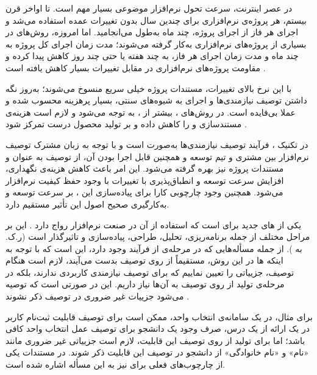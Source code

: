   

در عصر اینترنت، سرعت تحول نرم‌افزار موضوعی بسیار مهم است. تا اواخر قرن
بیستم، هر پروژه‌ی نرم‌افزاری برای چندین سال بدون تغییرات عمده استفاده
می‌شد و اجرای هر فاز از اجرای پروژه، چند ماه به‌طول می‌انجامید. اما
امروزه، روش‌های  در بسیاری از پروژه‌های نرم‌افزاری به‌کار
گرفته می‌شوند؛ مدت زمان اجرای کل پروژه به چند ماه و مدت زمان اجرای هر
فاز، به چند هفته یا حتی چند روز کاهش پیدا کرده و مقاومت پروژه‌های
نرم‌افزاری در مقابل تغییرات بسیار کاهش یافته است .

با این نرخ بالای تغییرات، مستندات پروژه خیلی سریع منسوخ می‌شوند؛ به‌روز
نگه داشتن توصیف نیازمندی‌ها و اجرای  به شیوه‌های سنتی، بسیار
پرهزینه محسوب شده و عملا بی‌فایده است. در روش‌های ،
بیشتر از ، به
 توجه می‌شود و لازم
است هزینه‌ی مستندسازی و  را کاهش داده و بر تولید محصول درست
تمرکز شود .

در تکنیک ، فرآیند توصیف نیازمندی‌ها به‌صورت
 است و با توجه به زبان مشترک توصیف نرم‌افزار بین مشتری و
تیم توسعه و همچنین قابل اجرا بودن آن، از توصیف به عنوان  و
مستندات پروژه نیز بهره گرفته می‌شود. این امر باعث کاهش هزینه‌ی نگهداری،
افزایش سرعت توسعه  و انطباق‌پذیری با تغییرات با وجود حفظ
کیفیت نرم‌افزار می‌شود. همچنین وجود چارچوبی کارا برای پیاده‌سازی این
، بر سرعت توسعه و به‌کارگیری صحیح اصول این 
تأثیر مستقیم دارد.

  یکی
از ‌های جدید برای  است که استفاده از آن در
صنعت نرم‌افزار رواج دارد . این  بر
مراحل مختلف  از جمله برنامه‌ریزی، تحلیل، طراحی،
پیاده‌سازی و  تاثیرگذار است (ر.ک. به
). از جمله مسأله‌هایی که در مرحله‌ی  از
فرآیند  وجود دارد، این است که با توجه به اینکه
 ها در این روش، مستقیماً از روی توصیف بدست می‌آیند،
لازم است هنگام توصیف، جزییاتی را تعیین نماییم که برای توصیف نیازمندی
کاربردی ندارند، بلکه در مرحله‌ی تولید  از روی توصیف
به آن‌ها نیاز داریم. این در صورتی است که توصیه می‌شود جزییات غیر ضروری
در توصیف ذکر نشوند .

برای مثال، در یک سامانه‌ی انتخاب واحد، ممکن است برای توصیف قابلیت
ثبت‌نام کاربر در یک ارائه از یک درس، صرف وجود یک دانشجو برای توصیف عمل
انتخاب واحد کافی باشد؛ اما برای تولید  از روی توصیف
این قابلیت، لازم است جزییاتی غیر ضروری مانند «نام» و «نام خانوادگی» از دانشجو
در توصیف این قابلیت ذکر شوند. در مستندات یکی از چارچوب‌های فعلی برای
  نیز به این مسأله اشاره شده است.

